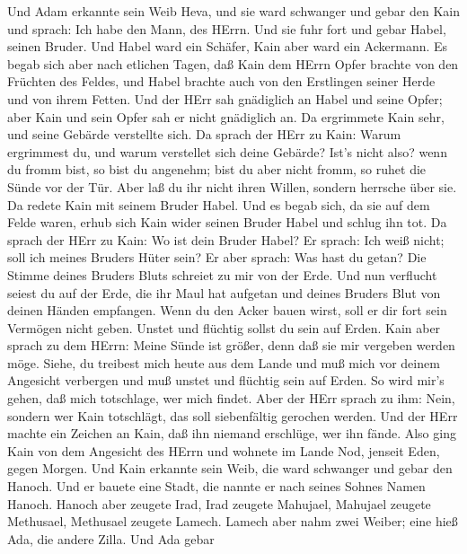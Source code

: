  Und Adam erkannte sein Weib Heva, und sie ward schwanger
und gebar den Kain und sprach: Ich habe den Mann, des HErrn.
 Und sie fuhr fort und gebar Habel, seinen Bruder. Und Habel
ward ein Schäfer, Kain aber ward ein Ackermann.  Es begab
sich aber nach etlichen Tagen, daß Kain dem HErrn Opfer brachte von den
Früchten des Feldes,  und Habel brachte auch von den
Erstlingen seiner Herde und von ihrem Fetten. Und der HErr sah
gnädiglich an Habel und seine Opfer;  aber Kain und sein
Opfer sah er nicht gnädiglich an. Da ergrimmete Kain sehr, und seine
Gebärde verstellte sich.  Da sprach der HErr zu Kain: Warum
ergrimmest du, und warum verstellet sich deine Gebärde? 
Ist's nicht also? wenn du fromm bist, so bist du angenehm; bist du aber
nicht fromm, so ruhet die Sünde vor der Tür. Aber laß du ihr nicht ihren
Willen, sondern herrsche über sie.  Da redete Kain mit
seinem Bruder Habel. Und es begab sich, da sie auf dem Felde waren,
erhub sich Kain wider seinen Bruder Habel und schlug ihn tot.
 Da sprach der HErr zu Kain: Wo ist dein Bruder Habel? Er
sprach: Ich weiß nicht; soll ich meines Bruders Hüter sein?
 Er aber sprach: Was hast du getan? Die Stimme deines
Bruders Bluts schreiet zu mir von der Erde.  Und nun
verflucht seiest du auf der Erde, die ihr Maul hat aufgetan und deines
Bruders Blut von deinen Händen empfangen.  Wenn du den
Acker bauen wirst, soll er dir fort sein Vermögen nicht geben. Unstet
und flüchtig sollst du sein auf Erden.  Kain aber sprach zu
dem HErrn: Meine Sünde ist größer, denn daß sie mir vergeben werden
möge.  Siehe, du treibest mich heute aus dem Lande und muß
mich vor deinem Angesicht verbergen und muß unstet und flüchtig sein auf
Erden. So wird mir's gehen, daß mich totschlage, wer mich findet.
 Aber der HErr sprach zu ihm: Nein, sondern wer Kain
totschlägt, das soll siebenfältig gerochen werden. Und der HErr machte
ein Zeichen an Kain, daß ihn niemand erschlüge, wer ihn fände.
 Also ging Kain von dem Angesicht des HErrn und wohnete im
Lande Nod, jenseit Eden, gegen Morgen.  Und Kain erkannte
sein Weib, die ward schwanger und gebar den Hanoch. Und er bauete eine
Stadt, die nannte er nach seines Sohnes Namen Hanoch. 
Hanoch aber zeugete Irad, Irad zeugete Mahujael, Mahujael zeugete
Methusael, Methusael zeugete Lamech.  Lamech aber nahm zwei
Weiber; eine hieß Ada, die andere Zilla.  Und Ada gebar

